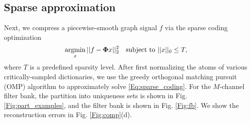 \documentclass{article}
\begin{document}
\subsection{Sparse approximation}
Next, we compress 
a piecewise-smooth graph signal $f$ via the sparse coding optimization
\begin{align}\label{Eq:sparse_coding}
\operatorname*{argmin}_x   || f-\boldsymbol{\Phi}x ||_2^2 \hbox{~~~subject to } ||x||_0 \leq T,
\end{align}
where $T$ is a predefined sparsity level. After first normalizing the atoms of various critically-sampled dictionaries, we use the greedy %
 orthogonal matching pursuit (OMP) algorithm \cite{tropp2004greed,elad_book} to approximately solve \eqref{Eq:sparse_coding}. For the $M$-channel filter bank, the partition into uniqueness sets is shown in Fig. \ref{Fig:part_examples}, and the filter bank is shown in Fig. \ref{Fig:fb}. We show the reconstruction errors in Fig. \ref{Fig:comp}(d). 
\end{document}
